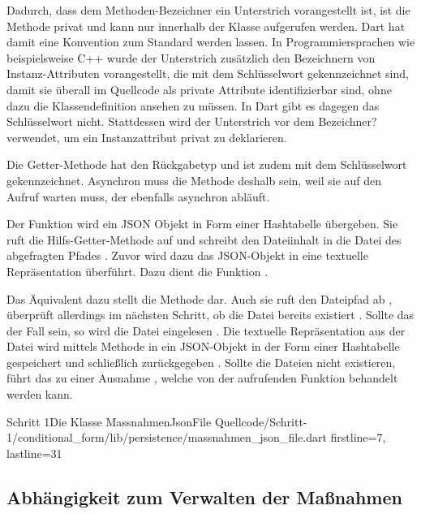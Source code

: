Dadurch, dass dem Methoden-Bezeichner  ein Unterstrich vorangestellt ist, ist die Methode privat und kann nur innerhalb der Klasse aufgerufen werden.
Dart hat damit eine Konvention zum Standard werden lassen.
In Programmiersprachen wie beispielsweise C++ wurde der Unterstrich zusätzlich den Bezeichnern von Instanz-Attributen vorangestellt, die mit dem  Schlüsselwort gekennzeichnet sind, damit sie überall im Quellcode als private Attribute identifizierbar sind, ohne dazu die Klassendefinition ansehen zu müssen.
In Dart gibt es dagegen das  Schlüsselwort nicht.
Stattdessen wird der Unterstrich vor dem Bezeichner? verwendet, um ein Instanzattribut privat zu deklarieren.

Die Getter-Methode  hat den Rückgabetyp  und ist zudem mit dem Schlüsselwort  gekennzeichnet.
Asynchron muss die Methode deshalb sein, weil sie auf den Aufruf  warten muss, der ebenfalls asynchron abläuft.

Der Funktion   wird ein JSON Objekt in Form einer Hashtabelle übergeben.
Sie ruft die Hilfs-Getter-Methode   auf und schreibt den Dateiinhalt in die Datei des abgefragten Pfades .
Zuvor wird dazu das JSON-Objekt in eine textuelle Repräsentation überführt.
Dazu dient die Funktion .

Das Äquivalent dazu stellt die Methode   dar.
Auch sie ruft den Dateipfad ab , überprüft allerdings im nächsten Schritt, ob die Datei bereits existiert .
Sollte das der Fall sein, so wird die Datei eingelesen .
Die textuelle Repräsentation aus der Datei wird mittels Methode  in ein JSON-Objekt in der Form einer Hashtabelle gespeichert  und schließlich zurückgegeben .
Sollte die Dateien nicht existieren, führt das zu einer Ausnahme , welche von der aufrufenden Funktion behandelt werden kann.

\begin{alexlisting}{Schritt 1}{Die Klasse MassnahmenJsonFile}
  {Quellcode/Schritt-1/conditional_form/lib/persistence/massnahmen_json_file.dart}
  {firstline=7, lastline=31}
  \label{lst:Schritt1KlasseMassnahmenJsonFile}
\end{alexlisting}

\clearpage
\subsection{ Abhängigkeit zum Verwalten der Maßnahmen}

